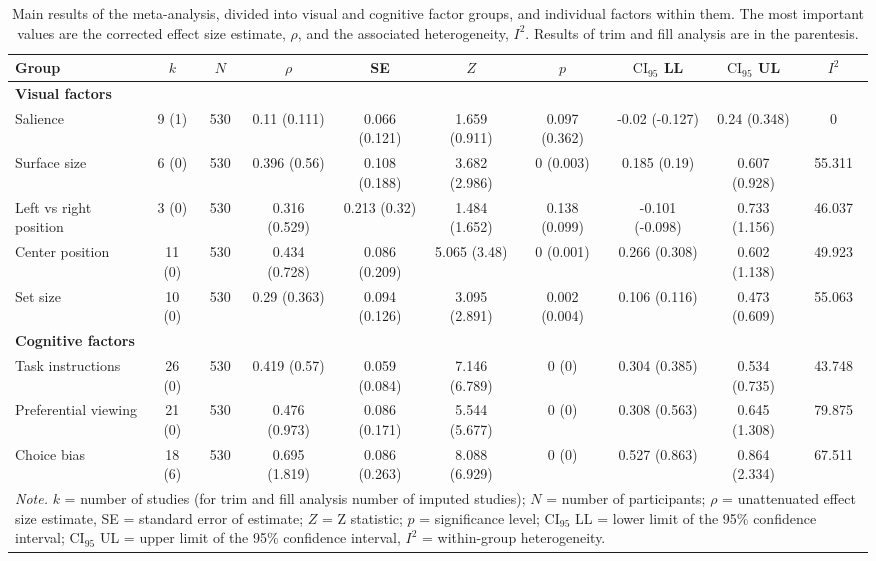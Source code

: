 \begin{table}[ht]
\centering
\caption{Main results of the meta-analysis, divided into visual and cognitive factor groups, and individual factors within them. The most important values are the corrected effect size estimate, $\rho$, and the associated heterogeneity, $I^2$. Results of trim and fill analysis are in the parentesis.} 
\label{tab:main_results}
\begin{tabular}{lccccccccc}
  \hline
Group & $k$ & $N$ & $\rho$ & SE & $Z$ & $p$ & $\textrm{CI}_{95}$ LL & $\textrm{CI}_{95}$ UL & $I^2$ \\ 
  \hline
\textbf{Visual factors} &  &  &  &  &  &  &  &  &  \\ 
  Salience & 9 (1) & 530 & 0.11 (0.111) & 0.066 (0.121) & 1.659 (0.911) & 0.097 (0.362) & -0.02 (-0.127) & 0.24 (0.348) & 0 \\ 
  Surface size & 6 (0) & 530 & 0.396 (0.56) & 0.108 (0.188) & 3.682 (2.986) & 0 (0.003) & 0.185 (0.19) & 0.607 (0.928) & 55.311 \\ 
  Left vs right position & 3 (0) & 530 & 0.316 (0.529) & 0.213 (0.32) & 1.484 (1.652) & 0.138 (0.099) & -0.101 (-0.098) & 0.733 (1.156) & 46.037 \\ 
  Center position & 11 (0) & 530 & 0.434 (0.728) & 0.086 (0.209) & 5.065 (3.48) & 0 (0.001) & 0.266 (0.308) & 0.602 (1.138) & 49.923 \\ 
  Set size & 10 (0) & 530 & 0.29 (0.363) & 0.094 (0.126) & 3.095 (2.891) & 0.002 (0.004) & 0.106 (0.116) & 0.473 (0.609) & 55.063 \\ 
  \textbf{Cognitive factors} &  &  &  &  &  &  &  &  &  \\ 
  Task instructions & 26 (0) & 530 & 0.419 (0.57) & 0.059 (0.084) & 7.146 (6.789) & 0 (0) & 0.304 (0.385) & 0.534 (0.735) & 43.748 \\ 
  Preferential viewing & 21 (0) & 530 & 0.476 (0.973) & 0.086 (0.171) & 5.544 (5.677) & 0 (0) & 0.308 (0.563) & 0.645 (1.308) & 79.875 \\ 
  Choice bias & 18 (6) & 530 & 0.695 (1.819) & 0.086 (0.263) & 8.088 (6.929) & 0 (0) & 0.527 (0.863) & 0.864 (2.334) & 67.511 \\ 
   \hline 
 \multicolumn{10}{p{0.9\textwidth}}{\scriptsize{\textit{Note.} $k$ = number of studies (for trim and fill analysis number of imputed studies); $N$ = number of participants; $\rho$ = unattenuated effect size estimate, SE = standard error of estimate; $Z$ = Z statistic; $p$ = significance level; $\textrm{CI}_{95}$ LL = lower limit of the 95\% confidence interval; $\textrm{CI}_{95}$ UL = upper limit of the 95\% confidence interval, $I^2$ = within-group heterogeneity.}} 
\end{tabular}
\end{table}
